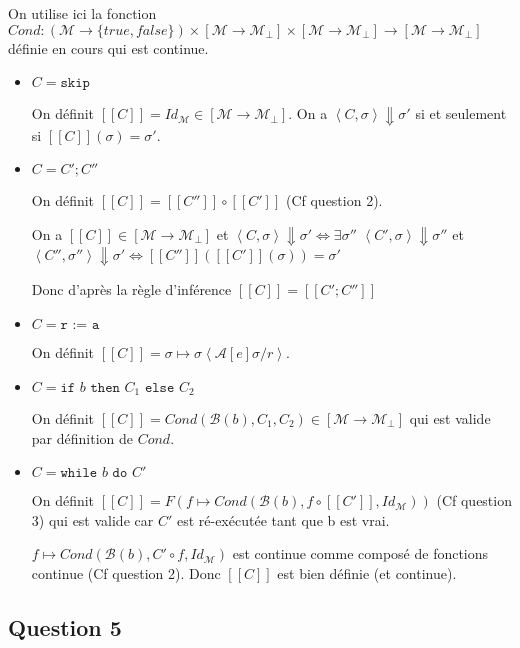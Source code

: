 \documentclass{article}
\newcommand{\M}{\mathcal{M}}
\newcommand{\Cr}[1]{[\![#1]\!]}
\newcommand{\Co}[1]{\left \langle #1 \right \rangle}
\begin{document}
On utilise ici la fonction $Cond : (\M \rightarrow \{ true, false \}) \times [\M \rightarrow \M_\bot] \times [\M \rightarrow \M_\bot] \rightarrow [\M \rightarrow \M_\bot]$ définie en cours qui est continue.

\begin{itemize}
    \item $C = \texttt{skip}$
    
   On définit $\Cr{C} = Id_\M \in [\M \rightarrow \M_\bot]$. On a $\Co{C, \sigma} \Downarrow \sigma'$  si et seulement si  $\Cr{C}(\sigma) = \sigma'$.
    
    \item $C = C' ; C''$
    
    On définit $\Cr{C}= \Cr{C''} \circ \Cr{C'}$ (Cf question 2).
    
      On a $\Cr{C} \in [\M \rightarrow \M_\bot]$ et $\Co{C, \sigma} \Downarrow \sigma' \Leftrightarrow\exists \sigma''$ $\Co{C', \sigma} \Downarrow \sigma''$ et $\Co{C'', \sigma''} \Downarrow \sigma'\Leftrightarrow\Cr{C''}(\Cr{C'}(\sigma)) = \sigma'$ 
      
      Donc d'après la règle d'inférence $\Cr{C}=\Cr{C' ; C''}$
    
    \item $C = \texttt{r := a}$ 
    
    On définit $\Cr{C} = \sigma \mapsto \sigma\Co{\mathcal{A}[e]\sigma/r}$.
    
    \item $C = \texttt{if } b \texttt{ then } C_1 \texttt{ else } C_2$
    
    On définit $\Cr{C} = Cond(\mathcal{B}(b), C_1, C_2) \in [\M \rightarrow \M_\bot]$ qui est valide par définition de $Cond$.
    
    \item $C = \texttt{while } b \texttt{ do } C'$
    
    On définit $\Cr{C} = F(f \mapsto Cond(\mathcal{B}(b),  f\circ \Cr{C'}, Id_\M))$ (Cf question 3) qui est valide car $C'$ est ré-exécutée  tant que b est vrai.
    
      $f \mapsto Cond(\mathcal{B}(b), C' \circ f, Id_\M)$ est continue comme composé de fonctions continue (Cf question 2). Donc $\Cr{C}$ est bien définie (et continue).
\end{itemize}

\subsection*{Question 5}
\end{document}
